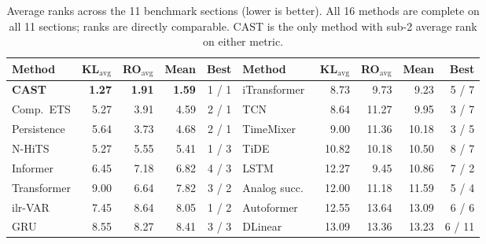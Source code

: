 \begin{table}[t]
\centering
\caption{Average ranks across the 11 benchmark sections (lower is better). All 16 methods are complete on all 11 sections; ranks are directly comparable. CAST is the only method with sub-2 average rank on either metric.}
\label{tab:main-average-ranks}
\scriptsize
\setlength{\tabcolsep}{3.2pt}
\begin{tabular}{@{}l rrrr@{\hspace{1.0em}}l rrrr@{}}
\toprule
Method & KL$_\text{avg}$ & RO$_\text{avg}$ & Mean & Best & Method & KL$_\text{avg}$ & RO$_\text{avg}$ & Mean & Best \\
\midrule
\textbf{CAST}       & \textbf{1.27} & \textbf{1.91} & \textbf{1.59} & 1 / 1 & iTransformer & 8.73  & 9.73  & 9.23  & 5 / 7 \\
Comp.\ ETS          & 5.27          & 3.91          & 4.59          & 2 / 1 & TCN          & 8.64  & 11.27 & 9.95  & 3 / 7 \\
Persistence         & 5.64          & 3.73          & 4.68          & 2 / 1 & TimeMixer    & 9.00  & 11.36 & 10.18 & 3 / 5 \\
N-HiTS              & 5.27          & 5.55          & 5.41          & 1 / 3 & TiDE         & 10.82 & 10.18 & 10.50 & 8 / 7 \\
Informer            & 6.45          & 7.18          & 6.82          & 4 / 3 & LSTM         & 12.27 & 9.45  & 10.86 & 7 / 2 \\
Transformer         & 9.00          & 6.64          & 7.82          & 3 / 2 & Analog succ.\ & 12.00 & 11.18 & 11.59 & 5 / 4 \\
ilr-VAR             & 7.45          & 8.64          & 8.05          & 1 / 2 & Autoformer   & 12.55 & 13.64 & 13.09 & 6 / 6 \\
GRU                 & 8.55          & 8.27          & 8.41          & 3 / 3 & DLinear      & 13.09 & 13.36 & 13.23 & 6 / 11 \\
\bottomrule
\end{tabular}
\end{table}

